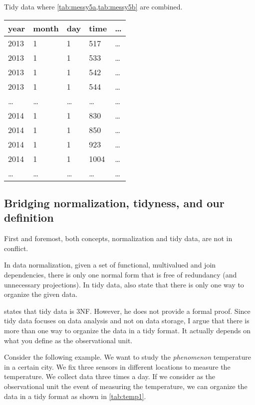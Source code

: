 \begin{tablebox}[label=tab:tidy5]{Tidy data where \cref{tab:messy5a,tab:messy5b} are combined.}
  \centering
  \begin{tabular}{lllll}
    \toprule
    year & month & day & time & \dots \\
    \midrule
    2013 & 1 & 1 & 517 & \dots \\
    2013 & 1 & 1 & 533 & \dots \\
    2013 & 1 & 1 & 542 & \dots \\
    2013 & 1 & 1 & 544 & \dots \\
    \dots & \dots & \dots & \dots & \dots \\
    2014 & 1 & 1 & 830 & \dots \\
    2014 & 1 & 1 & 850 & \dots \\
    2014 & 1 & 1 & 923 & \dots \\
    2014 & 1 & 1 & 1004 & \dots \\
    \dots & \dots & \dots & \dots & \dots \\
    \bottomrule
  \end{tabular}
\end{tablebox}

\subsection{Bridging normalization, tidyness, and our definition}

First and foremost, both concepts, normalization and tidy data, are not in conflict.

In data normalization, given a set of functional, multivalued and join dependencies, there
is only one normal form that is free of redundancy (and unnecessary projections).  In tidy data,
\citeauthor{Wickham2023} also state that there is only one way to organize the given data.

\textcite{Wickham2014} states that tidy data is 3NF.  However, he does not provide a
formal proof.  Since tidy data focuses on data analysis and not on data storage, I argue
that there is more than one way to organize the data in a tidy format.  It actually
depends on what you define as the observational unit.

Consider the following example.  We want to study the \emph{phenomenon} temperature in a
certain city.  We fix three sensors in different locations to measure the temperature.  We
collect data three times a day.  If we consider as the observational unit the
event of measuring the temperature, we can organize the data in a tidy format as shown in
\cref{tab:temp1}.

